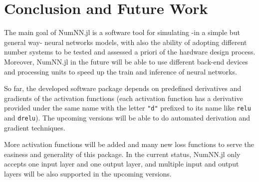\section{Conclusion and Future Work}

The main goal of NumNN.jl is a software tool for simulating -in a simple but general way- neural networks models, with also the ability of adopting different number systems to be tested and assessed a priori of the hardware design process. Moreover, NumNN.jl in the future will be able to use different back-end devices and processing units to speed up the train and inference of neural networks. 

So far, the developed software package depends on predefined derivatives and gradients of the activation functions (each activation function has a derivative provided under the same name with the letter \texttt{"d"} prefixed to its name like \texttt{relu} and \texttt{drelu}). The upcoming versions will be able to do automated derivation and gradient techniques.

More activation functions will be added and many new loss functions to serve the easiness and generality of this package. In the current status, NumNN.jl only accepts one input layer and one output layer, and multiple input and output layers will be also supported in the upcoming versions.



